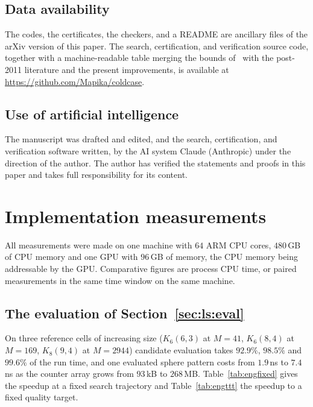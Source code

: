 \documentclass[11pt]{amsart}
\newcommand{\Kq}[3]{K_{#1}(#2,#3)}
\begin{document}
\subsection*{Data availability}
The codes, the certificates, the checkers, and a README are ancillary
files of the arXiv version of this paper. The search, certification, and
verification source code, together with a machine-readable table merging
the bounds of~\cite{Keri} with the post-2011 literature and the present
improvements, is available at \url{https://github.com/Mapika/coldcase}.

\subsection*{Use of artificial intelligence}
The manuscript was drafted and edited, and the search, certification, and
verification software written, by the AI system Claude (Anthropic) under
the direction of the author. The author has verified the statements and
proofs in this paper and takes full responsibility for its content.




\appendix

\section{Implementation measurements}\label{app:impl}

All measurements were made on one machine with $64$ ARM CPU cores,
$480$\,GB of CPU memory and one GPU with $96$\,GB of memory, the CPU
memory being addressable by the GPU. Comparative figures are process CPU
time, or paired measurements in the same time window on the same machine.

\subsection{The evaluation of Section~\textup{\ref{sec:ls:eval}}}
\label{app:impl:cpu}

On three reference cells of increasing size ($\Kq{6}{6}{3}$ at $M=41$,
$\Kq{6}{8}{4}$ at $M=169$, $\Kq{8}{9}{4}$ at $M=2944$) candidate
evaluation takes $92.9\%$, $98.5\%$ and $99.6\%$ of the run time, and one
evaluated sphere pattern costs from $1.9$\,ns to $7.4$\,ns as the counter
array grows from $93$\,kB to $268$\,MB. Table~\ref{tab:engfixed} gives the
speedup at a fixed search trajectory and Table~\ref{tab:engttt} the
speedup to a fixed quality target.
\end{document}
